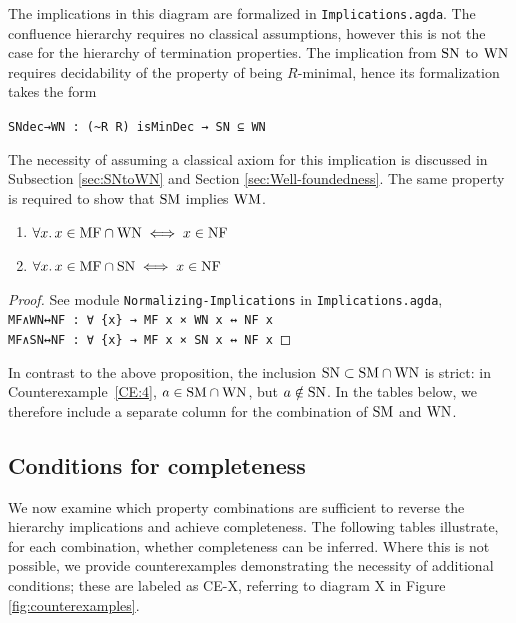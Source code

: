 The implications in this diagram are formalized in \texttt{Implications.agda}.
The confluence hierarchy requires no classical assumptions, however this is not the case for the hierarchy of termination properties.
The implication from $\mathrm{SN}$ to $\mathrm{WN}$ requires decidability of the property
of being $R$-minimal, hence its formalization takes the form

\verb|SNdec→WN : (~R R) isMinDec → SN ⊆ WN|

The necessity of assuming a classical axiom for this implication is discussed 
in Subsection \ref{sec:SNtoWN} and
Section \ref{sec:Well-foundedness}.
The same property is required to show that $\mathrm{SM}$ implies $\mathrm{WM}$.

\begin{proposition}\label{prop:MFtoNF} \hfill
    \begin{enumerate}
        \item $\forall x.\, x\in \mathrm{MF} \cap \mathrm{WN} \iff x \in \mathrm{NF}$
        \item $\forall x.\, x\in \mathrm{MF} \cap \mathrm{SN} \iff x \in \mathrm{NF}$
    \end{enumerate}

\end{proposition}
\begin{proof}
    See module \texttt{Normalizing-Implications} in \texttt{Implications.agda},\\
    \verb|MF∧WN↔NF : ∀ {x} → MF x × WN x ↔ NF x|\\
    \verb|MF∧SN↔NF : ∀ {x} → MF x × SN x ↔ NF x| \qedhere
\end{proof}

In contrast to the above proposition, the inclusion $\mathrm{SN} \subset \mathrm{SM} \cap \mathrm{WN} $ is strict: in Counterexample~\ref{CE:4}, $a \in \mathrm{SM} \cap \mathrm{WN}$, but $a \notin \mathrm{SN}$. In the tables below, we therefore include a separate column for the combination of $\mathrm{SM}$ and $\mathrm{WN}$.
\subsection{Conditions for completeness}\label{subsec:counterexamples}


We now examine which property combinations are sufficient to reverse the hierarchy implications and achieve completeness. The following tables illustrate, for each combination, whether completeness can be inferred. Where this is not possible, we provide counterexamples demonstrating the necessity of additional conditions; these are labeled as CE-X, referring to diagram X in Figure \ref{fig:counterexamples}.

